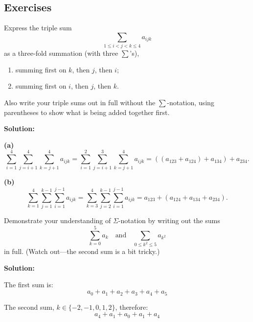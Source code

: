 \subsection{Exercises}
\begin{exercise}
    Express the triple sum
\[
\sum_{1 \leq i < j < k \leq 4} a_{ijk}
\]
as a three-fold summation (with three \(\sum\)'s), 

\begin{enumerate}[label=\alph*.]
    \item summing first on \( k \), then \( j \), then \( i \);
    \item summing first on \( i \), then \( j \), then \( k \).
\end{enumerate}
Also write your triple sums out in full without the \(\sum\)-notation, using parentheses to show what is being added together first.
\end{exercise}
\textbf{Solution:}

\textbf{(a)} \[
\sum_{i=1}^{4} \sum_{j=i+1}^{4} \sum_{k=j+1}^{4} a_{ijk} = 
\sum_{i=1}^{2} \sum_{j=i+1}^{3} \sum_{k=j+1}^{4} a_{ijk} = 
((a_{123} + a_{124}) + a_{134}) + a_{234}.
\]

\textbf{(b)} \[
\sum_{k=1}^{4} \sum_{j=1}^{k-1} \sum_{i=1}^{j-1} a_{ijk} = 
\sum_{k=3}^{4} \sum_{j=2}^{k-1} \sum_{i=1}^{j-1} a_{ijk} = 
a_{123} + (a_{124} + a_{134} + a_{234}).
\]

\begin{exercise}
    Demonstrate your understanding of \(\Sigma\)-notation by writing out the sums
\[
\sum_{k=0}^{5} a_k \quad \text{and} \quad \sum_{0\leq k^2 \leq 5} a_{k^2}
\]
in full. (Watch out—the second sum is a bit tricky.)

\end{exercise}
\textbf{Solution:}

The first sum is:
\[
a_0 + a_1 + a_2 + a_3 + a_4 + a_5
\]

The second sum,  $k \in \{-2, -1, 0, 1, 2\}$, therefore:
\[
a_4 + a_1 + a_0 + a_1 + a_4
\]

